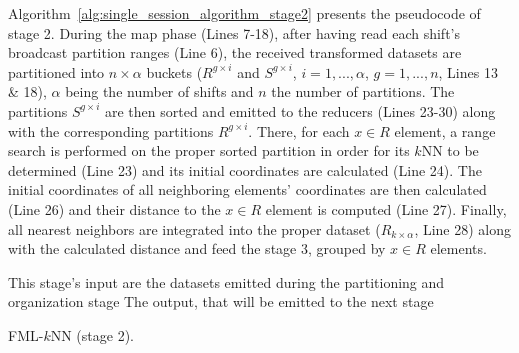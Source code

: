Algorithm~\ref{alg:single_session_algorithm_stage2} presents the pseudocode of stage 2. During the map phase (Lines 7-18), after having read each shift's broadcast partition ranges (Line 6), the received transformed datasets are partitioned into $n \times \alpha$ buckets ($R^{g \times i}$ and $S^{g \times i}$, $i=1,...,\alpha$, $g=1,...,n$, Lines 13 \& 18), $\alpha$ being the number of shifts and $n$ the number of partitions. The partitions $S^{g \times i}$ are then sorted and emitted to the reducers (Lines 23-30) along with the corresponding partitions $R^{g \times i}$. There, for each $x \in R$ element, a range search is performed on the proper sorted partition in order for its $k$NN to be determined (Line 23) and its initial coordinates are calculated (Line 24). The initial coordinates of all neighboring elements' coordinates are then calculated (Line 26) and their distance to the $x \in R$ element is computed (Line 27). Finally, all nearest neighbors are integrated into the proper dataset ($R_{k \times \alpha}$, Line 28) along with the calculated distance and feed the stage 3, grouped by $x \in R$ elements.

\begin{algorithm}[h!]
	\scriptsize
	\DontPrintSemicolon
	\Comment This stage's input are the datasets emitted during the partitioning and organization stage \;
	\Comment The output, that will be emitted to the next stage \;
	\BlankLine
	\caption{FML-$k$NN (stage 2).}
	\label{alg:single_session_algorithm_stage2}	
\end{algorithm}

